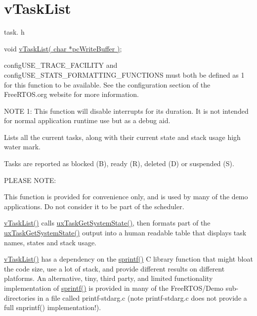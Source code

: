 \hypertarget{group__v_task_list}{}\section{v\+Task\+List}
\label{group__v_task_list}
task. h 
\begin{DoxyPre}void \hyperlink{task_8h_ab87abc717f34ddced76802d12588a93d}{vTaskList( char *pcWriteBuffer )};\end{DoxyPre}


config\+U\+S\+E\+\_\+\+T\+R\+A\+C\+E\+\_\+\+F\+A\+C\+I\+L\+I\+TY and config\+U\+S\+E\+\_\+\+S\+T\+A\+T\+S\+\_\+\+F\+O\+R\+M\+A\+T\+T\+I\+N\+G\+\_\+\+F\+U\+N\+C\+T\+I\+O\+NS must both be defined as 1 for this function to be available. See the configuration section of the Free\+R\+T\+O\+S.\+org website for more information.

N\+O\+TE 1\+: This function will disable interrupts for its duration. It is not intended for normal application runtime use but as a debug aid.

Lists all the current tasks, along with their current state and stack usage high water mark.

Tasks are reported as blocked (\textquotesingle{}B\textquotesingle{}), ready (\textquotesingle{}R\textquotesingle{}), deleted (\textquotesingle{}D\textquotesingle{}) or suspended (\textquotesingle{}S\textquotesingle{}).

P\+L\+E\+A\+SE N\+O\+TE\+:

This function is provided for convenience only, and is used by many of the demo applications. Do not consider it to be part of the scheduler.

\hyperlink{task_8h_ab87abc717f34ddced76802d12588a93d}{v\+Task\+List()} calls \hyperlink{task_8h_a5bd92b080086390cae790e5bd74bd018}{ux\+Task\+Get\+System\+State()}, then formats part of the \hyperlink{task_8h_a5bd92b080086390cae790e5bd74bd018}{ux\+Task\+Get\+System\+State()} output into a human readable table that displays task names, states and stack usage.

\hyperlink{task_8h_ab87abc717f34ddced76802d12588a93d}{v\+Task\+List()} has a dependency on the \hyperlink{derivative_8h_a5998f60c4f4af322b36debdbd11d7917}{sprintf()} C library function that might bloat the code size, use a lot of stack, and provide different results on different platforms. An alternative, tiny, third party, and limited functionality implementation of \hyperlink{derivative_8h_a5998f60c4f4af322b36debdbd11d7917}{sprintf()} is provided in many of the Free\+R\+T\+O\+S/\+Demo sub-\/directories in a file called printf-\/stdarg.\+c (note printf-\/stdarg.\+c does not provide a full snprintf() implementation!).

